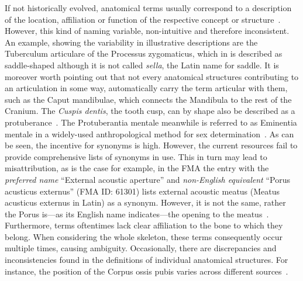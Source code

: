 \documentclass[sw]{iosart2x}
\begin{document}
If not historically evolved, anatomical terms usually correspond to a description of the location, affiliation or function of the respective concept or structure~\citep{reforminganatomical}.
However, this kind of naming variable, non-intuitive and therefore inconsistent.
An example, showing the variability in illustrative descriptions are the Tuberculum articulare of the Processus zygomaticus, which in \cite{anatomie} is described as saddle-shaped although it is not called \emph{sella}, the Latin name for saddle.
It is moreover worth pointing out that not every anatomical structures contributing to an articulation in some way, automatically carry the term articular with them, such as the Caput mandibulae, which connects the Mandibula to the rest of the Cranium.
The \emph{Cuspis dentis}, the tooth cusp, can by shape also be described as a protuberance~\citep{pocketatlas,anatomylexicon2008}.
The Protuberantia mentale meanwhile is referred to as Eminentia mentale in a widely-used anthropological method for sex determination~\citep{datacollection}.
As can be seen, the incentive for synonyms is high.
However, the current resources fail to provide comprehensive lists of synonyms in use.
 This in turn may lead to misattribution, as is the case for example, in the FMA the entry with the \emph{preferred name} \enquote{External acoustic aperture} and \emph{non-English equivalent} \enquote{Porus acusticus externus} (FMA ID: 61301) lists external acoustic meatus (Meatus acusticus externus in Latin) as a synonym.
However, it is not the same, rather the Porus is---as its English name indicates---the opening to the meatus~\citep{anatomylexicon}.
Furthermore, terms oftentimes lack clear affiliation to the bone to which they belong.
When considering the whole skeleton, these terms consequently occur multiple times, causing ambiguity.
Occasionally, there are discrepancies and inconsistencies found in the definitions of individual anatomical structures.
For instance, the position of the Corpus ossis pubis varies across different sources~\citep{anatomylexicon,prometheus,allgemeineanatomie,dualereiheanatomie,anatomiedesmenschen}.
\end{document}
